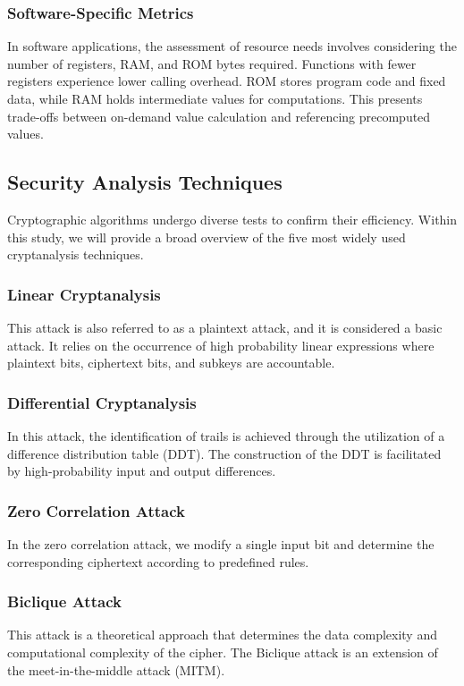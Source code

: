 \documentclass[conference,compsoc]{IEEEtran}
\begin{document}
\subsubsection{Software-Specific Metrics} 
In software applications, the assessment of resource needs involves considering the number of registers, RAM, and ROM bytes required. Functions with fewer registers experience lower calling overhead. ROM stores program code and fixed data, while RAM holds intermediate values for computations. This presents trade-offs between on-demand value calculation and referencing precomputed values.
\subsection{Security Analysis Techniques}
Cryptographic algorithms undergo diverse tests to confirm their efficiency. Within this study, we will provide a broad overview of the five most widely used cryptanalysis techniques.
\subsubsection{Linear Cryptanalysis} 
This attack is also referred to as a plaintext attack, and it is considered a basic attack. It relies on the occurrence of high probability linear expressions where plaintext bits, ciphertext bits, and subkeys are accountable\cite{matsui1993linear}.
\subsubsection{Differential Cryptanalysis} 
In this attack, the identification of trails is achieved through the utilization of a difference distribution table (DDT). The construction of the DDT is facilitated by high-probability input and output differences\cite{heys2002tutorial}.
\subsubsection{Zero Correlation Attack} 
In the zero correlation attack, we modify a single input bit and determine the corresponding ciphertext according to predefined rules.\cite{zero}
\subsubsection{Biclique Attack} 
This attack is a theoretical approach that determines the data complexity and computational complexity of the cipher. The Biclique attack is an extension of the meet-in-the-middle attack (MITM)\cite{jeong2012biclique}.
\end{document}
